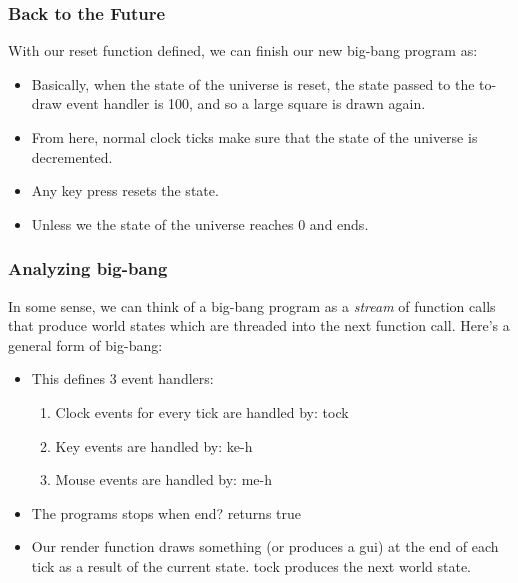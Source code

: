 \documentclass{beamer}
\begin{document}

\begin{frame}
  \frametitle{Back to the Future}
  With our reset function defined, we can finish our new big-bang
  program as:
  \pause
  \squareReset
  \begin{itemize}
  \item<2-> Basically, when the state of the universe is reset, the state
    passed to the to-draw event handler is 100, and so a large square is
    drawn again.
  \item<3-> From here, normal clock ticks make sure that the state of the universe
    is decremented.
  \item<4-> Any key press resets the state.
  \item<5-> Unless we the state of the universe reaches 0 and ends.
  \end{itemize}
\end{frame}


\begin{frame}
  \frametitle{Analyzing big-bang}
  In some sense, we can think of a big-bang program as a \emph{stream}
  of function calls that produce world states which are threaded into the next
  function call. Here's a general form of big-bang:
  \pause
  \generalForm
  \begin{itemize}
    \item<2-> This defines 3 event handlers:
      \begin{enumerate}
      \item<3-> Clock events for every tick are handled by: tock
      \item<4-> Key events are handled by: ke-h
      \item<5-> Mouse events are handled by: me-h
      \end{enumerate}
    \item<6-> The programs stops when end? returns true
    \item<7-> Our render function draws something (or produces a gui)
      at the end of each tick as a result of the current state. tock
      produces the next world state.
  \end{itemize}
\end{frame}
\end{document}
